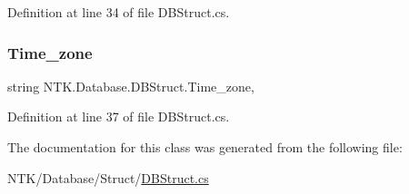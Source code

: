 Definition at line 34 of file D\+B\+Struct.\+cs.

\mbox{\label{class_n_t_k_1_1_database_1_1_d_b_struct_ac2234ff243e2da67b745ea794f8cb3be}} 
\subsubsection{\texorpdfstring{Time\_zone}{Time\_zone}}
{\footnotesize\ttfamily string N\+T\+K.\+Database.\+D\+B\+Struct.\+Time\+\_\+zone\hspace{0.3cm}{\ttfamily [get]}, {\ttfamily [set]}}



Definition at line 37 of file D\+B\+Struct.\+cs.



The documentation for this class was generated from the following file\+:\begin{DoxyCompactItemize}
\item 
N\+T\+K/\+Database/\+Struct/\mbox{\hyperlink{_d_b_struct_8cs}{D\+B\+Struct.\+cs}}\end{DoxyCompactItemize}
